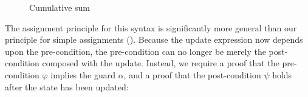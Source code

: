 \documentclass[sigplan]{acmart}%
\begin{document}
\begin{figure*}
\caption{Cumulative sum}
\label{fig:csum}
\end{figure*}
The assignment principle for this syntax is significantly more general 
than our principle for simple assignments ().
Because the update expression 
now depends upon the pre-condition, the pre-condition can no longer 
be merely the post-condition composed with the update. Instead,
we require a proof that the pre-condition $\varphi$ implies the guard $\alpha$,
and a proof that the post-condition $\psi$ holds after the state has been updated:
\end{document}
